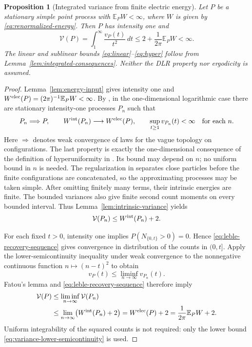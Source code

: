 \documentclass[11pt,reqno]{amsart}
\numberwithin{equation}{section}
\newtheorem{proposition}[theorem]{Proposition}
\theoremstyle{definition}
\theoremstyle{remark}
\newcommand{\E}{\mathbb E}
\newcommand{\1}{\mathbf 1}
\newcommand{\dd}{\,d}
\begin{document}
\begin{samepage}
\begin{proposition}[Integrated variance from finite electric energy]
\label{prop:energy-discrepancy}
Let $P$ be a stationary simple point process with $\E_PW<\infty$,
where $W$ is given by \eqref{eq:renormalized-energy}. Then $P$ has
intensity one and
\begin{equation}\label{eq:finite-energy-variance-conclusions}
\mathcal V(P)=\int_1^\infty\frac{v_P(t)}{t^2}\dd t
\le2+\frac1{2\pi}\E_PW<\infty.
\end{equation}
The linear and sublinear bounds \eqref{eq:linear}--\eqref{eq:hyper}
follow from Lemma~\ref{lem:integrated-consequences}. Neither the DLR
property nor ergodicity is assumed.
\end{proposition}
\end{samepage}

\begin{proof}
Lemma~\ref{lem:energy-input} gives intensity one and
$W^{\rm elec}(P)=(2\pi)^{-1}\E_PW<\infty$.
By \cite[Proposition~5.3, equation~(5.7)]{Leble}, in the
one-dimensional logarithmic case there are stationary intensity-one
processes $P_n$ such that
\begin{equation}\label{eq:leble-recovery-sequence}
P_n\Longrightarrow P,\qquad
W^{\rm int}(P_n)\longrightarrow W^{\rm elec}(P),\qquad
\sup_{t\ge1}v_{P_n}(t)<\infty\quad\text{for each }n.
\end{equation}
Here $\Longrightarrow$ denotes weak convergence of laws for the vague
topology on configurations. The last property is exactly the
one-dimensional consequence of the definition of hyperuniformity in
\cite[equation~(2.3)]{Leble}. Its bound may depend on $n$; no uniform
bound in $n$ is needed. The regularization in
\cite[Section~5.2.1]{Leble} separates close particles before the finite
configurations are concatenated, so the approximating processes may
be taken simple. After omitting finitely many terms, their intrinsic
energies are finite. The bounded variances also give finite second
count moments on every bounded interval. Thus
Lemma~\ref{lem:intrinsic-variance} yields
\[
\mathcal V(P_n)\le W^{\rm int}(P_n)+2.
\]

For each fixed $t>0$, intensity one implies
$P(N_{\{0,t\}}>0)=0$. Hence \eqref{eq:leble-recovery-sequence}
gives convergence in distribution of the counts in $(0,t]$.
Apply the lower-semicontinuity inequality under weak convergence
to the nonnegative continuous function $n\mapsto(n-t)^2$ to obtain
\begin{equation}\label{eq:variance-lower-semicontinuity}
v_P(t)\le\liminf_{n\to\infty}v_{P_n}(t).
\end{equation}
Fatou's lemma and \eqref{eq:leble-recovery-sequence} therefore imply
\begin{align*}
\mathcal V(P)
&\le\liminf_{n\to\infty}\mathcal V(P_n)\\
&\le\lim_{n\to\infty}\bigl(W^{\rm int}(P_n)+2\bigr)
 =W^{\rm elec}(P)+2
 =\frac1{2\pi}\E_PW+2.
\end{align*}
Uniform integrability of the squared counts is not required: only
the lower bound \eqref{eq:variance-lower-semicontinuity} is used.
\end{proof}
\end{document}
